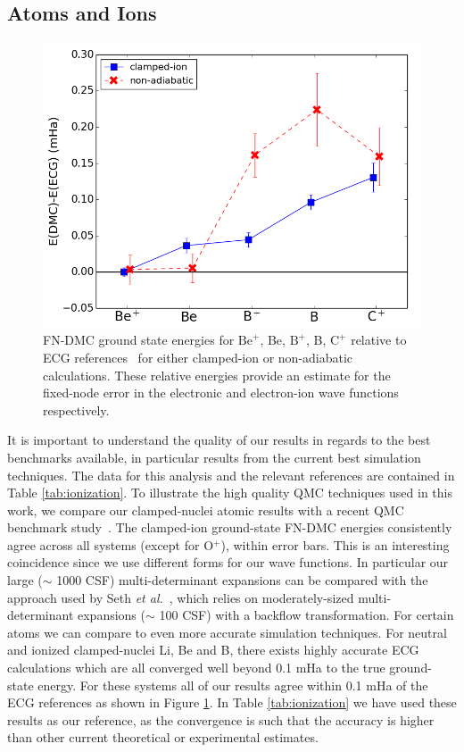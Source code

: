 \documentclass[pra,superscriptaddress,groupedaddress,twocolumn]{revtex4}
\begin{document}
\subsection{Atoms and Ions}

\begin{figure}[t]
\centering
\includegraphics[scale=.4]{Figures/atom-ECG}
\caption{FN-DMC ground state energies for $\text{Be}^+$, Be, $\text{B}^+$, B, $\text{C}^+$ relative to ECG references~\cite{Stanke_Be,Puchalski_Be+,Bubin_BeH_noBO,Bubin_B,Bubin_B+,Bubin_C+} for either clamped-ion or non-adiabatic calculations. These relative energies provide an estimate for the fixed-node error in the electronic and electron-ion wave functions respectively.\label{fig:atom-ECG}}
\end{figure}

It is important to understand the quality of our results in regards to the best benchmarks available, in particular results from the current best simulation techniques. The data for this analysis and the relevant references are contained in Table \ref{tab:ionization}. To illustrate the high quality QMC techniques used in this work, we compare our clamped-nuclei atomic results with a recent QMC benchmark study~\cite{Seth_Bench}. The clamped-ion ground-state FN-DMC energies consistently agree across all systems (except for O$^{+}$), within error bars. This is an interesting coincidence since we use different forms for our wave functions. In particular our large ($\sim$ 1000 CSF) multi-determinant expansions can be compared with the approach used by Seth {\it et al.}~\cite{Seth_Bench}, which relies on moderately-sized multi-determinant expansions ($\sim$ 100 CSF) with a backflow transformation. For certain atoms we can compare to even more accurate simulation techniques. For neutral and ionized clamped-nuclei Li, Be and B, there exists highly accurate ECG calculations which are all converged well beyond 0.1 mHa to the true ground-state energy. For these systems all of our results agree within 0.1 mHa of the ECG references as shown in Figure \ref{fig:atom-ECG}. In Table \ref{tab:ionization} we have used these results as our reference, as the convergence is such that the accuracy is higher than other current theoretical or experimental estimates.
\end{document}
